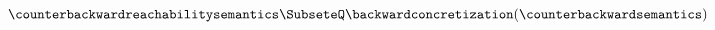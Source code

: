 
\[\counterbackwardreachabilitysemantics\SubseteQ\backwardconcretization(\counterbackwardsemantics)\]
